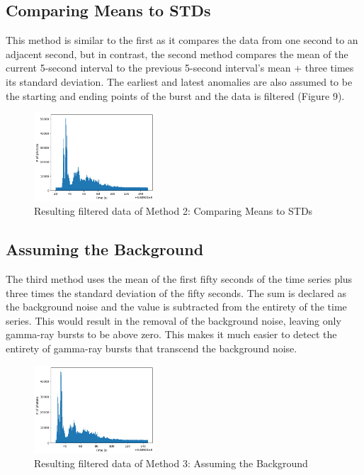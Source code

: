 \documentclass[final,5p,times,twocolumn,authoryear]{elsarticle}
\begin{document}
\subsection{Comparing Means to STDs}
This method is similar to the first as it compares the data from one second to an adjacent second, but in contrast, the second method compares the mean of the current 5-second interval to the previous 5-second interval's mean + three times its standard deviation. The earliest and latest anomalies are also assumed to be the starting and ending points of the burst and the data is filtered (Figure 9).
\begin{figure}[H]
	\centering 
	\includegraphics[width=0.4\textwidth]{images/CompareMeanToSTD.png}	
	\caption{Resulting filtered data of Method 2: Comparing Means to STDs} 
	\label{fig_mom0}%
\end{figure}
\subsection{Assuming the Background}
The third method uses the mean of the first fifty seconds of the time series plus three times the standard deviation of the fifty seconds. The sum is declared as the background noise and the value is subtracted from the entirety of the time series. This would result in the removal of the background noise, leaving only gamma-ray bursts to be above zero. This makes it much easier to detect the entirety of gamma-ray bursts that transcend the background noise.
\begin{figure}[H]
	\centering 
	\includegraphics[width=0.4\textwidth]{images/FiftySecBG.png}	
	\caption{Resulting filtered data of Method 3: Assuming the Background} 
	\label{fig_mom0}%
\end{figure}
\end{document}
